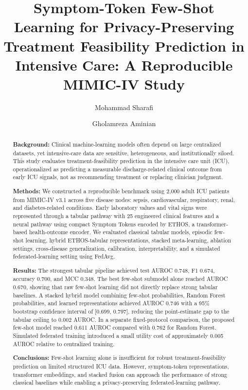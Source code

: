 \documentclass[11pt]{article}
\title{\textbf{Symptom-Token Few-Shot Learning for Privacy-Preserving Treatment Feasibility Prediction in Intensive Care: A Reproducible MIMIC-IV Study}}
\author[1]{Mohammad Sharafi}
\author[1]{Gholamreza Aminian}
\affil[1]{Department of Computer Engineering, Islamic Azad University, Tehran North Branch, Tehran, Iran}
\date{}
\newcommand{\modelname}{ETHOS}
\newcommand{\mimic}{MIMIC-IV v3.1}
\newcommand{\auroc}{AUROC}
\newcommand{\ci}[2]{[#1, #2]}
\begin{document}
\maketitle

\begin{abstract}
\textbf{Background:} Clinical machine-learning models often depend on large centralized datasets, yet intensive-care data are sensitive, heterogeneous, and institutionally siloed. This study evaluates treatment-feasibility prediction in the intensive care unit (ICU), operationalized as predicting a measurable discharge-related clinical outcome from early ICU signals, not as recommending treatment or replacing clinician judgment.

\textbf{Methods:} We constructed a reproducible benchmark using 2,000 adult ICU patients from \mimic{} across five disease nodes: sepsis, cardiovascular, respiratory, renal, and diabetes-related conditions. Early laboratory values and vital signs were represented through a tabular pathway with 25 engineered clinical features and a neural pathway using compact Symptom Tokens encoded by \modelname{}, a transformer-based health-outcome encoder. We evaluated classical tabular models, episodic few-shot learning, hybrid \modelname{}-tabular representations, stacked meta-learning, ablation settings, cross-disease generalization, calibration, interpretability, and a simulated federated-learning setting using FedAvg.

\textbf{Results:} The strongest tabular pipeline achieved test \auroc{} 0.748, F1 0.674, accuracy 0.700, and MCC 0.348. The best few-shot submodel alone reached \auroc{} 0.670, showing that raw few-shot learning did not directly replace strong tabular baselines. A stacked hybrid model combining few-shot probabilities, Random Forest probabilities, and learned representations achieved \auroc{} 0.746 with a 95\% bootstrap confidence interval of \ci{0.699}{0.797}, reducing the point-estimate gap to the tabular ceiling to 0.002 \auroc{}. In a separate fixed-protocol comparison, the proposed few-shot model reached 0.611 \auroc{} compared with 0.762 for Random Forest. Simulated federated training introduced a small utility cost of approximately 0.005 \auroc{} relative to centralized training.

\textbf{Conclusions:} Few-shot learning alone is insufficient for robust treatment-feasibility prediction on limited structured ICU data. However, symptom-token representations, transformer embeddings, and stacked fusion can approach the performance of strong classical baselines while enabling a privacy-preserving federated-learning pathway.
\end{abstract}
\end{document}
